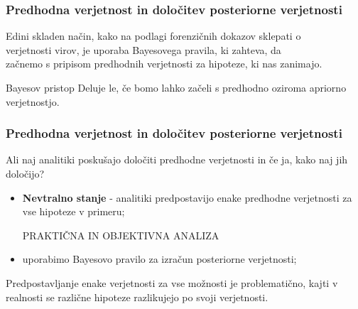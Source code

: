 \documentclass{beamer}
\begin{document}
\begin{frame}
    \frametitle{Predhodna verjetnost in določitev posteriorne verjetnosti}
    \begin{beamerboxesrounded}{}
        Edini skladen način, kako na podlagi forenzičnih dokazov sklepati o \\ verjetnosti virov, je uporaba Bayesovega pravila, ki zahteva, da \\ začnemo s
        pripisom predhodnih verjetnosti za hipoteze, ki nas zanimajo.
    \end{beamerboxesrounded} \vspace{4mm}
    \begin{beamerboxesrounded}{Bayesov pristop}
        Deluje le, če bomo lahko začeli s predhodno oziroma apriorno \\ verjetnostjo.
    \end{beamerboxesrounded}
\end{frame}

\begin{frame}
    \frametitle{Predhodna verjetnost in določitev posteriorne verjetnosti}
    \begin{beamerboxesrounded}{Ali naj analitiki poskušajo določiti predhodne verjetnosti in če ja, kako naj jih določijo?}
    \end{beamerboxesrounded}\vspace{2mm}
    \begin{itemize}
        \item \textbf{Nevtralno stanje} - analitiki predpostavijo enake predhodne verjetnosti za vse hipoteze v primeru; \\ \vspace{2mm}
        \begin{block}{}
            \centering
            PRAKTIČNA IN OBJEKTIVNA ANALIZA
        \end{block} \vspace{3mm}
        \item uporabimo Bayesovo pravilo za izračun posteriorne verjetnosti; \vspace{2mm}
    \end{itemize}
    Predpostavljanje enake verjetnosti za vse možnosti je problematično, kajti v realnosti se različne hipoteze razlikujejo po svoji verjetnosti.
\end{frame}
\end{document}
